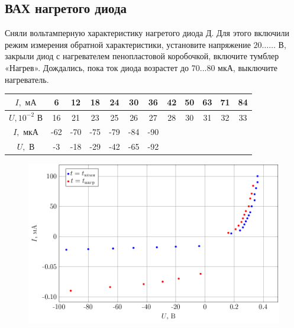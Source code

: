 \subsection{ВАХ нагретого диода}
Сняли вольтамперную характеристику нагретого диода Д. Для этого включили режим измерения
обратной характеристики, установите напряжение $20…\ldots$ В, закрыли диод с нагревателем пенопластовой коробочкой, включите тумблер «Нагрев». Дождались, пока ток диода возрастет до 70...80 мкА, выключите нагреватель.
\begin{table}[htbp]
	\centering
	\begin{tabular}{|c|c|c|c|c|c|c|c|c|c|c|c|}
		\toprule
		$I, \text{ мА}$ & 6     & 12    & 18    & 24    & 30    & 36    & 42    & 50    & 63    & 71    & 84 \\
		\midrule
		$U, 10^{-2} \text{ В}$ & 16    & 21    & 23    & 25    & 26    & 27    & 28    & 30    & 31    & 32    & 33 \\
		\midrule
		$I, \text{ мкА}$ & -62   & -70   & -75   & -79   & -84   & -90   &       &       &       &       &  \\
		\midrule
		$U, \text{ В}$  & -3    & -18   & -29   & -42   & -65   & -92   &       &       &       &       &  \\
		\bottomrule
	\end{tabular}%
\end{table}%
\begin{figure}[H]
	\centering
	\includegraphics[width=\linewidth]{plots/plot4}
	\label{fig:10}
\end{figure}
